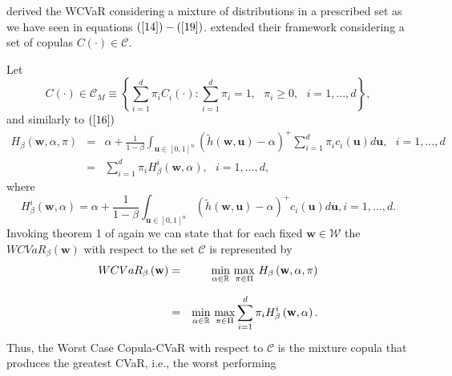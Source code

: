 \documentclass[a4paper,12pt]{report}
\begin{document}
\citet*{zhu2009worst} derived the WCVaR considering a mixture of
distributions in a prescribed set as we have seen in equations $\left( \ref%
{14}\right) -\left( \ref{19}\right) $. \citet*{kakouris14} extended their
framework considering a set of copulas $C\left( \cdot \right) \in \mathcal{C}
$.

Let
\begin{equation}
C\left( \cdot \right) \in \mathcal{C}_{M}\equiv \left\{ \sum_{i=1}^{d}\pi
_{i}C_{i}\left( \cdot \right) :\sum_{i=1}^{d}\pi _{i}=1,\text{ }\pi _{i}\geq
0,\text{ }i=1,...,d\right\} ,  \label{28}
\end{equation}%
and similarly to $\left( \ref{16}\right) $
\begin{eqnarray}
H_{\beta }\left( \mathbf{w},\alpha ,\pi \right) &=&\alpha +\frac{1}{1-\beta }%
\int_{\mathbf{u}\in \left[ 0,1\right] ^{n}}\left( \widetilde{h}\left( \mathbf{w,u}%
\right) -\alpha \right) ^{+}\sum_{i=1}^{d}\pi _{i}c_{i}\left( \mathbf{u}%
\right) d\mathbf{u},\text{ }i=1,...,d  \label{28b} \\
&=&\sum_{i=1}^{d}\pi _{i}H_{\beta }^{i}\left( \mathbf{w},\alpha \right) ,%
\text{ }i=1,...,d,  \label{29}
\end{eqnarray}%
where%
\begin{equation}
H_{\beta }^{i}\left( \mathbf{w},\alpha \right) =\alpha +\frac{1}{1-\beta }%
\int_{\mathbf{u}\in \left[ 0,1\right] ^{n}}\left( \widetilde{h}\left( \mathbf{w,u}%
\right) -\alpha \right) ^{+}c_{i}\left( \mathbf{u}\right) d\mathbf{u},\text{
}i=1,...,d.  \label{30}
\end{equation}%
Invoking theorem 1 of \citet*{zhu2009worst} again we can state that for each
fixed $\mathbf{w}\in \mathcal{W}$ the $WCVaR_{\beta }\left( \mathbf{w}%
\right) $ with respect to the set $\mathcal{C}$ is represented by
\begin{eqnarray}
WCVaR_{\beta }\left( \mathbf{w}\right) &=&\underset{}{\underset{\alpha \in
		\mathbb{R}
	}{\min }~\underset{\pi \in \Pi }{\max }}~H_{\beta }\left( \mathbf{w},\alpha
,\pi \right)  \notag \\
&=&\underset{}{\underset{\alpha \in
		\mathbb{R}
	}{\min }~\underset{\pi \in \Pi }{\max }}\sum_{i=1}^{d}\pi _{i}H_{\beta
}^{i}\left( \mathbf{w},\alpha \right) .  \label{31}
\end{eqnarray}%
Thus, the Worst Case Copula-CVaR with respect to $\mathcal{C}$ is the
mixture copula that produces the greatest CVaR, i.e., the worst performing
\end{document}

